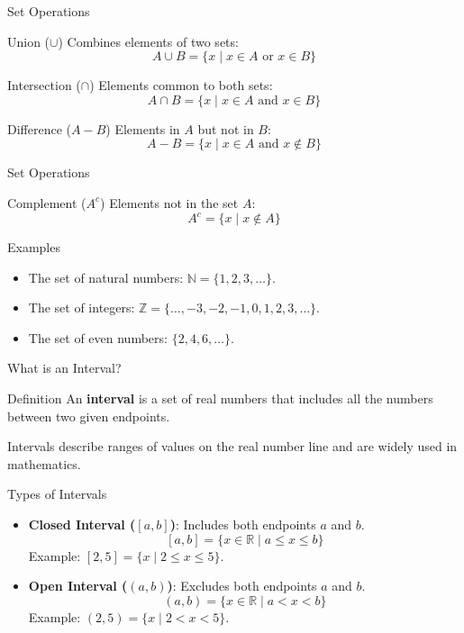 \documentclass{beamer}
\begin{document}
\begin{frame}{Set Operations}
  \begin{block}{Union (\(\cup\))}
      Combines elements of two sets:
      \[
      A \cup B = \{x \mid x \in A \text{ or } x \in B\}
      \]
  \end{block}
  \begin{block}{Intersection (\(\cap\))}
      Elements common to both sets:
      \[
      A \cap B = \{x \mid x \in A \text{ and } x \in B\}
      \]
  \end{block}
  \begin{block}{Difference (\(A - B\))}
      Elements in \(A\) but not in \(B\):
      \[
      A - B = \{x \mid x \in A \text{ and } x \notin B\}
      \]
  \end{block}
\end{frame}
\begin{frame}{Set Operations}
  \begin{block}{Complement (\(A^c\))}
    Elements not in the set \(A\):
    \[
    A^c = \{x \mid x \notin A\}
    \]
\end{block}
  \begin{block}{Examples}
      \begin{itemize}
          \item The set of natural numbers: \(\mathbb{N} = \{1, 2, 3, \dots\}\).
          \item The set of integers: \(\mathbb{Z} = \{\dots, -3, -2, -1, 0, 1, 2, 3, \dots\}\).
          \item The set of even numbers: \(\{2, 4, 6, \dots\}\).
      \end{itemize}
  \end{block}
\end{frame} 
\begin{frame}{What is an Interval?}
  \begin{block}{Definition}
      An \textbf{interval} is a set of real numbers that includes all the numbers between two given endpoints.
  \end{block}
  \vspace{10pt}
  Intervals describe ranges of values on the real number line and are widely used in mathematics.
\end{frame}
\begin{frame}{Types of Intervals}
  \begin{itemize}
      \item \textbf{Closed Interval (\([a, b]\))}: Includes both endpoints \(a\) and \(b\).
      \[
      [a, b] = \{x \in \mathbb{R} \mid a \leq x \leq b\}
      \]
      Example: \([2, 5] = \{x \mid 2 \leq x \leq 5\}\).
      \vspace{5pt}

      \item \textbf{Open Interval (\((a, b)\))}: Excludes both endpoints \(a\) and \(b\).
      \[
      (a, b) = \{x \in \mathbb{R} \mid a < x < b\}
      \]
      Example: \((2, 5) = \{x \mid 2 < x < 5\}\).
  \end{itemize}
\end{frame}
\end{document}
